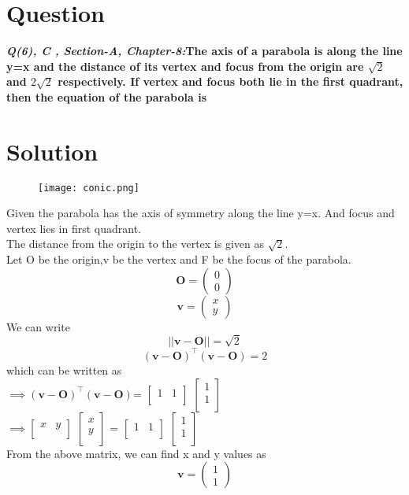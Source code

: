 \documentclass[10pt, a4paper]{article}
\title{\mytitle}
\author{\myauthor\hspace{1em}\\\contact\\FWC22097 -\hspace{0.5em}IITH\hspace{0.5em}\mymodule\hspace{6em}}
\date{}
\newcommand{\myvec}[1]{\ensuremath{\begin{pmatrix}#1\end{pmatrix}}}
\let\vec\mathbf
\begin{document}
\maketitle


\section{Question}
\textbf{\textit{Q(6), C , Section-A, Chapter-8:}The axis of a parabola is along the line y=x and the distance of  its vertex and focus from the origin are $\sqrt{2}$ and $2\sqrt{2}$    respectively. If vertex and focus both lie in the first quadrant, then the equation of the parabola is }

\section{Solution}
\raggedright 

\begin{figure}[h!]
\centering
\texttt{[image: conic.png]} \\
\end{figure}

\vspace{0.25cm}
Given the parabola has the axis of symmetry along the line y=x. And focus and vertex lies in first quadrant.\\ The distance from the origin to the vertex is given as $\sqrt{2}$.\\
Let O be the origin,v be the vertex and F be the focus of the parabola.
$$\vec{O}=\myvec{ 0 \\ 0}$$
$$\vec{v}=\myvec{ x \\ y}$$
We can write
$$||\vec{v}-\vec{O}||=\sqrt{2}$$
$$(\vec{v-O})^{\top}(\vec{v-O})=2$$
which can be written as \\
$\implies(\vec{v-O})^{\top}(\vec{v-O})$=
$
\begin{bmatrix}
1 & 1 \\
\end{bmatrix}
$
$
\begin{bmatrix}
1 \\
1 \\
\end{bmatrix}
$ \\

$
\implies\begin{bmatrix}
x & y \\
\end{bmatrix}
$
$
\begin{bmatrix}
x \\
y \\
\end{bmatrix}
$ = 
$
\begin{bmatrix}
1 & 1 \\
\end{bmatrix}
$
$
\begin{bmatrix}
1 \\
1 \\
\end{bmatrix}
$ \\
\vspace{0.5cm}
From the above matrix, we can find x and y values as 
$$\vec{v}=\myvec{ 1 \\ 1}$$
\end{document}
